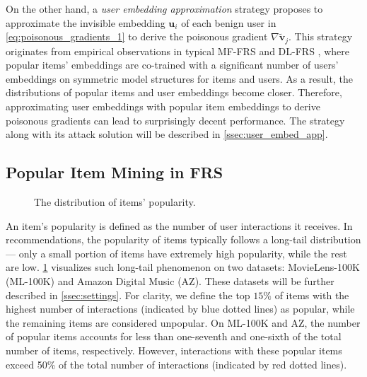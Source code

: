 On the other hand, a \emph{user embedding approximation} strategy proposes to approximate the invisible embedding $\mathbf{u}_i$ of each benign user in \cref{eq:poisonous_gradients_1} to derive the poisonous gradient $\nabla\tilde{\mathbf{v}}_j$.
This strategy originates from empirical observations in typical MF-FRS \cite{ammad2019federated,FedRec,FedRec++,9162459} and DL-FRS \cite{WangYCYZZ22,perifanis2022federated,jiang2022fedncf}, where popular items' embeddings are co-trained with a significant number of users' embeddings on symmetric model structures for items and users. As a result, the distributions of popular items and user embeddings become closer.
Therefore, approximating user embeddings with popular item embeddings to derive poisonous gradients can lead to surprisingly decent performance.
The strategy along with its attack solution \modelII{} will be described in \cref{ssec:user_embed_app}.



\subsection{Popular Item Mining in FRS}
\label{ssec:popular_items}
\begin{figure}[!tbp]
\centering
    \caption{The distribution of items' popularity.}
    \label{fig:inter_dis}
\end{figure}

An item's popularity is defined as the number of user interactions it receives. 
In recommendations, the popularity of items typically follows a long-tail distribution \cite{zhang2021model} --- only a small portion of items have extremely high popularity, while the rest are low.
\cref{fig:inter_dis} visualizes such long-tail phenomenon on two datasets: MovieLens-100K (ML-100K) and Amazon Digital Music (AZ). These datasets will be further described in \cref{ssec:settings}.
For clarity, we define the top $15\%$ of items with the highest number of interactions (indicated by blue dotted lines) as popular, while the remaining items are considered unpopular.
On ML-100K and AZ, the number of popular items accounts for less than one-seventh and one-sixth of the total number of items, respectively. However, interactions with these popular items exceed 50\% of the total number of interactions (indicated by red dotted lines).

